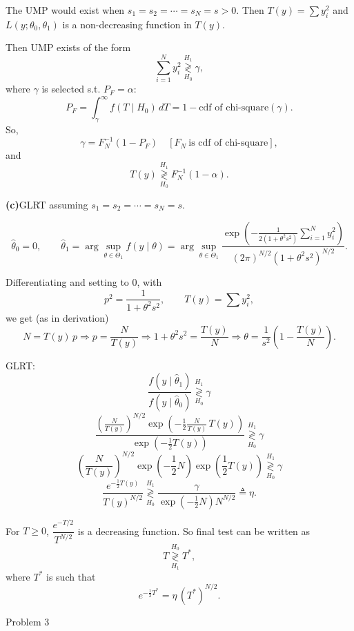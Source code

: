 \documentclass[12pt,a4paper,onecolumn]{exam}
\newcommand{\questionheader}[1]{%
  \begin{tcolorbox}[
    enhanced,
    colback=black,
    coltext=white,
    boxrule=0pt,
    fontupper=\Large\bfseries,
    arc=4mm
  ]
  #1
  \end{tcolorbox}%
}
\begin{document}
\begin{solution}
The UMP would exist when $s_1=s_2=\cdots=s_N=s>0$.
Then $T(y)=\sum y_i^2$ and $L(y;\theta_0,\theta_1)$ is a non-decreasing function in $T(y)$.

Then UMP exists of the form
\[
\sum_{i=1}^{N}y_i^2\underset{H_0}{\overset{H_1}{\gtrless}}\gamma,
\]
where $\gamma$ is selected s.t. $P_F=\alpha$:
\[
P_F=\int_{\gamma}^{\infty} f(T\mid H_0)\,dT
=1-\text{cdf of chi-square}(\gamma).
\]
So,
\[
\gamma=F_N^{-1}(1-P_F)\quad [F_N\ \text{is cdf of chi-square}],
\]
and
\[
T(y)\underset{H_0}{\overset{H_1}{\gtrless}}F_N^{-1}(1-\alpha).
\]

\textbf{(c)}\quad GLRT assuming $s_1=s_2=\cdots=s_N=s$.

\[
\hat\theta_0=0,
\qquad
\hat\theta_1=\arg\sup_{\theta\in\Theta_1}f(y\mid\theta)
=\arg\sup_{\theta\in\Theta_1}
\frac{\exp\left(-\frac{1}{2(1+\theta^2 s^2)}\sum_{i=1}^{N}y_i^2\right)}{(2\pi)^{N/2}(1+\theta^2 s^2)^{N/2}}.
\]

Differentiating and setting to 0, with
\[
p^2=\frac{1}{1+\theta^2 s^2},\qquad T(y)=\sum y_i^2,
\]
we get (as in derivation)
\[
N=T(y)\,p
\Rightarrow p=\frac{N}{T(y)}
\Rightarrow 1+\theta^2 s^2=\frac{T(y)}{N}
\Rightarrow \theta=\frac{1}{s^2}\left(1-\frac{T(y)}{N}\right).
\]

GLRT:
\[
\frac{f(y\mid\hat\theta_1)}{f(y\mid\hat\theta_0)}\underset{H_0}{\overset{H_1}{\gtrless}}\gamma
\]
\[
\frac{\left(\frac{N}{T(y)}\right)^{N/2}\exp\left(-\frac{1}{2}\frac{N}{T(y)}\,T(y)\right)}{\exp\left(-\frac{1}{2}T(y)\right)}
\underset{H_0}{\overset{H_1}{\gtrless}}\gamma
\]
\[
\left(\frac{N}{T(y)}\right)^{N/2}\exp\left(-\frac{1}{2}N\right)\exp\left(\frac{1}{2}T(y)\right)
\underset{H_0}{\overset{H_1}{\gtrless}}\gamma
\]
\[
\frac{e^{-\frac{1}{2}T(y)}}{T(y)^{N/2}}
\underset{H_0}{\overset{H_1}{\gtrless}}
\frac{\gamma}{\exp\left(-\frac{1}{2}N\right)N^{N/2}}\triangleq\eta.
\]

For $T\ge0$, $\dfrac{e^{-T/2}}{T^{N/2}}$ is a decreasing function.
So final test can be written as
\[
T\underset{H_1}{\overset{H_0}{\gtrless}}T^*,
\]
where $T^*$ is such that
\[
e^{-\frac{1}{2}T^*}=\eta\,(T^*)^{N/2}.
\]

\end{solution}

\questionheader{Problem 3}
\end{document}
